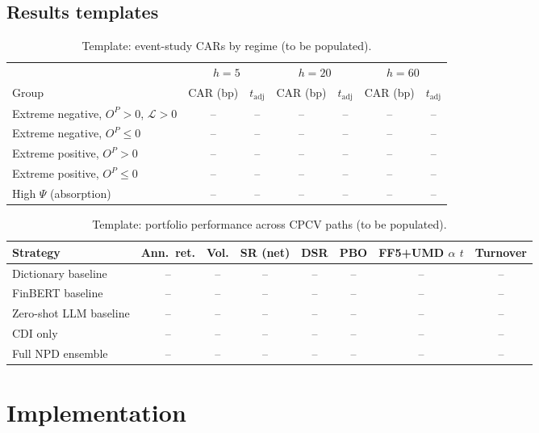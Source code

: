 \documentclass[11pt,a4paper]{article}
\theoremstyle{plain}
\theoremstyle{definition}
\theoremstyle{remark}
\begin{document}
\subsection{Results templates}
\begin{table}[ht]
\centering
\caption{Template: event-study CARs by regime (to be populated).}\label{tab:results-car}
\small
\begin{tabular}{@{}lcccccc@{}}
\toprule
 & \multicolumn{2}{c}{$h=5$} & \multicolumn{2}{c}{$h=20$} & \multicolumn{2}{c}{$h=60$} \\
\cmidrule(lr){2-3}\cmidrule(lr){4-5}\cmidrule(lr){6-7}
Group & CAR (bp) & $t_{\mathrm{adj}}$ & CAR (bp) & $t_{\mathrm{adj}}$ & CAR (bp) & $t_{\mathrm{adj}}$ \\
\midrule
Extreme negative, $O^P>0$, $\mathcal{L}>0$ & -- & -- & -- & -- & -- & -- \\
Extreme negative, $O^P\le0$ & -- & -- & -- & -- & -- & -- \\
Extreme positive, $O^P>0$ & -- & -- & -- & -- & -- & -- \\
Extreme positive, $O^P\le0$ & -- & -- & -- & -- & -- & -- \\
High $\Psi$ (absorption) & -- & -- & -- & -- & -- & -- \\
\bottomrule
\end{tabular}
\end{table}

\begin{table}[ht]
\centering
\caption{Template: portfolio performance across CPCV paths (to be populated).}\label{tab:results-port}
\small
\begin{tabular}{@{}lccccccc@{}}
\toprule
Strategy & Ann.\ ret. & Vol. & SR (net) & DSR & PBO & FF5+UMD $\alpha$ $t$ & Turnover \\
\midrule
Dictionary baseline & -- & -- & -- & -- & -- & -- & -- \\
FinBERT baseline & -- & -- & -- & -- & -- & -- & -- \\
Zero-shot LLM baseline & -- & -- & -- & -- & -- & -- & -- \\
CDI only & -- & -- & -- & -- & -- & -- & -- \\
Full NPD ensemble & -- & -- & -- & -- & -- & -- & -- \\
\bottomrule
\end{tabular}
\end{table}

\section{Implementation}\label{sec:implementation}
\end{document}
